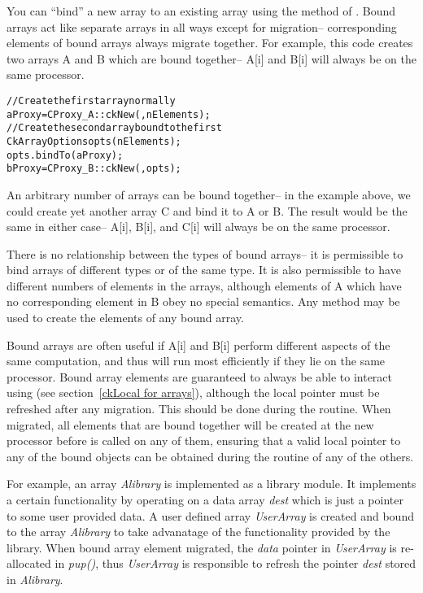 You can ``bind'' a new array to an existing array
using the  method of .  Bound arrays
act like separate arrays in all ways except for migration--
corresponding elements of bound arrays always migrate together.
For example, this code creates two arrays A and B which are
bound together-- A[i] and B[i] will always be on the same processor.

\begin{alltt}
//Create the first array normally
  aProxy=CProxy_A::ckNew(,nElements);
//Create the second array bound to the first
  CkArrayOptions opts(nElements);
  opts.bindTo(aProxy);
  bProxy=CProxy_B::ckNew(,opts);
\end{alltt}

An arbitrary number of arrays can be bound together--
in the example above, we could create yet another array
C and bind it to A or B.  The result would be the same
in either case-- A[i], B[i], and C[i] will always be
on the same processor.

There is no relationship between the types of bound arrays--
it is permissible to bind arrays of different types or of the
same type.  It is also permissible to have different numbers
of elements in the arrays, although elements of A which have
no corresponding element in B obey no special semantics.
Any method may be used to create the elements of any bound
array.

Bound arrays are often useful if A[i] and B[i] perform different 
aspects of the same computation, and thus will run most efficiently 
if they lie on the same processor.  Bound array elements are guaranteed
to always be able to interact using  (see 
section~\ref{ckLocal for arrays}), although the local pointer must
be refreshed after any migration. This should be done during the 
routine. When migrated, all elements that are bound together will be created
at the new processor before  is called on any of them, ensuring that
a valid local pointer to any of the bound objects can be obtained during the
 routine of any of the others.

For example, an array {\it Alibrary} is implemented as a library module.
It implements a certain functionality by operating on a data array {\it dest}
which is just a pointer to some user provided data.
A user defined array {\it UserArray} is created and bound to 
the array {\it Alibrary} to take advanatage of the functionality provided 
by the library.
When bound array element migrated, the {\it data} pointer in {\it UserArray}
is re-allocated in {\it pup()}, thus {\it UserArray} is responsible to refresh
the pointer {\it dest} stored in {\it Alibrary}.

